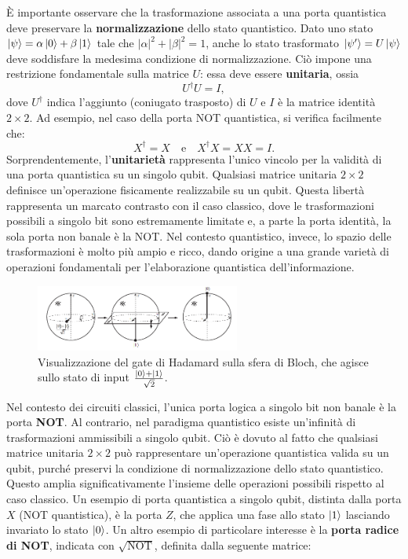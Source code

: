 \documentclass[a4paper,12pt]{report}
\theoremstyle{plain}
\begin{document}
È importante osservare che la trasformazione associata a una porta quantistica deve preservare la \textbf{normalizzazione} dello stato quantistico. Dato uno stato $\ket{\psi} = \alpha\ket{0} + \beta\ket{1}$ tale che $|\alpha|^2 + |\beta|^2 = 1$, anche lo stato trasformato $\ket{\psi'} = U\ket{\psi}$ deve soddisfare la medesima condizione di normalizzazione. Ciò impone una restrizione fondamentale sulla matrice $U$: essa deve essere \textbf{unitaria}, ossia
\[
U^\dagger U = I,
\]
dove $U^\dagger$ indica l'aggiunto (coniugato trasposto) di $U$ e $I$ è la matrice identità $2 \times 2$. Ad esempio, nel caso della porta NOT quantistica, si verifica facilmente che:
\[
X^\dagger = X \quad \text{e} \quad X^\dagger X = XX = I.
\]
Sorprendentemente, l'\textbf{unitarietà} rappresenta l'unico vincolo per la validità di una porta quantistica su un singolo qubit. Qualsiasi matrice unitaria $2 \times 2$ definisce un'operazione fisicamente realizzabile su un qubit. Questa libertà rappresenta un marcato contrasto con il caso classico, dove le trasformazioni possibili a singolo bit sono estremamente limitate e, a parte la porta identità, la sola porta non banale è la NOT. Nel contesto quantistico, invece, lo spazio delle trasformazioni è molto più ampio e ricco, dando origine a una grande varietà di operazioni fondamentali per l'elaborazione quantistica dell'informazione.
\begin{figure}[H]
    \centering
    \includegraphics[width=0.6\textwidth]{Immagine3.png} 
    \caption{Visualizzazione del gate di Hadamard sulla sfera di Bloch, che agisce sullo stato di input \(\frac{\ket{0} + \ket{1}}{\sqrt{2}}\).}
    \label{Immagine3}
\end{figure}
\noindent Nel contesto dei circuiti classici, l'unica porta logica a singolo bit non banale è la porta \textbf{NOT}. Al contrario, nel paradigma quantistico esiste un'infinità di trasformazioni ammissibili a singolo qubit. Ciò è dovuto al fatto che qualsiasi matrice unitaria $2 \times 2$ può rappresentare un'operazione quantistica valida su un qubit, purché preservi la condizione di normalizzazione dello stato quantistico. Questo amplia significativamente l'insieme delle operazioni possibili rispetto al caso classico.
Un esempio di porta quantistica a singolo qubit, distinta dalla porta $X$ (NOT quantistica), è la porta $Z$, che applica una fase allo stato $\ket{1}$ lasciando invariato lo stato $\ket{0}$. Un altro esempio di particolare interesse è la \textbf{porta radice di NOT}, indicata con $\sqrt{\text{NOT}}$, definita dalla seguente matrice:
\end{document}
